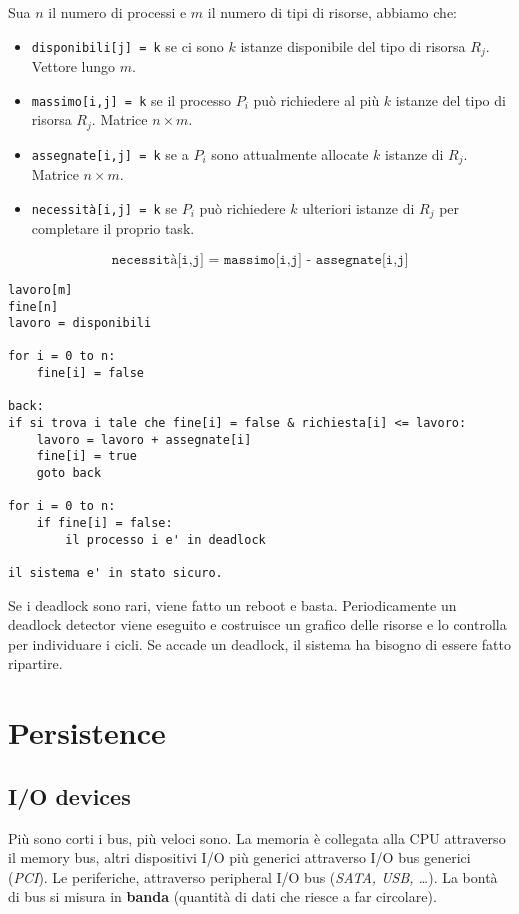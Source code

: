 \documentclass[12pt, letterpaper]{article}
\begin{document}
				Sua $n$ il numero di processi e $m$ il numero di tipi di risorse, abbiamo che:
				\begin{itemize}
					\item \texttt{disponibili[j] = k} se ci sono $k$ istanze disponibile del tipo di risorsa $R_j$. Vettore lungo $m$.
					\item \texttt{massimo[i,j] = k} se il processo $P_i$ può richiedere al più $k$ istanze del tipo di risorsa $R_j$. Matrice $n \times m$.
					\item \texttt{assegnate[i,j] = k} se a $P_i$ sono attualmente allocate $k$ istanze di $R_j$. Matrice $n \times m$.
					\item \texttt{necessità[i,j] = k} se $P_i$ può richiedere $k$ ulteriori istanze di $R_j$ per completare il proprio task. 
				\end{itemize}
				$$\texttt{necessità[i,j] = massimo[i,j] - assegnate[i,j]}$$
				
				\begin{lstlisting}[style=CStyle]
lavoro[m]
fine[n]
lavoro = disponibili

for i = 0 to n:
	fine[i] = false

back:
if si trova i tale che fine[i] = false & richiesta[i] <= lavoro:
	lavoro = lavoro + assegnate[i]
	fine[i] = true
	goto back
	
for i = 0 to n:
	if fine[i] = false:
		il processo i e' in deadlock

il sistema e' in stato sicuro.				\end{lstlisting}
				Se i deadlock sono rari, viene fatto un reboot e basta. Periodicamente un deadlock detector viene eseguito e costruisce un grafico delle risorse e lo controlla per individuare i cicli. Se accade un deadlock, il sistema ha bisogno di essere fatto ripartire.


				

				
			
\newpage	
	\section{Persistence}
		
		\subsection{I/O devices}
			Più sono corti i bus, più veloci sono. La memoria è collegata alla CPU attraverso il memory bus, altri dispositivi I/O più generici attraverso I/O bus generici (\textit{PCI}). Le periferiche, attraverso peripheral I/O bus (\textit{SATA, USB, \dots}). La bontà di bus si misura in \textbf{banda} (quantità di dati che riesce a far circolare).
			
\end{document}
